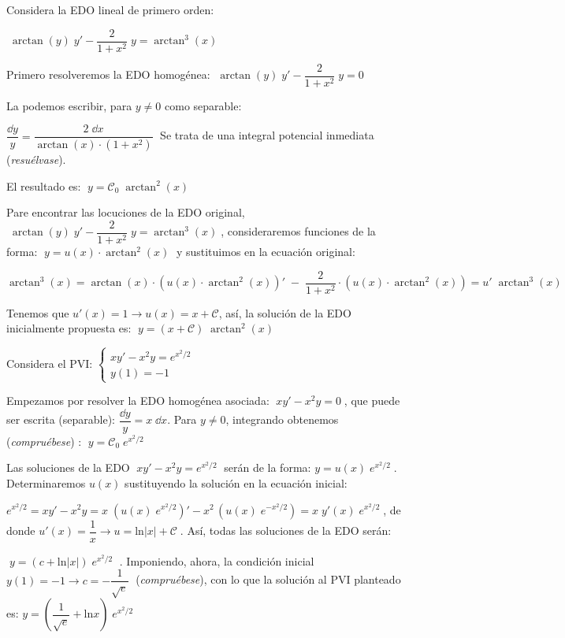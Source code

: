 \begin{ejem}
Considera la EDO lineal de primero orden: 

$\; \arctan(y)\; y'- \dfrac {2}{1+x^2}\; y=\arctan^3 (x)\; $	

Primero resolveremos la EDO homogénea: $\; \arctan(y)\; y'- \dfrac {2}{1+x^2} \; y=0\; $

La podemos escribir, para $y\neq 0$ como separable:

$\dfrac {\dd y}{y }= \dfrac {2\; \dd x} {\arctan (x) \cdot (1+x^2)}  \; $ Se trata de una integral potencial inmediata (\emph{resuélvase}). 

El resultado es: $\; y=\mathcal {C}_0 \; \arctan^2 (x)$ 

Pare encontrar las locuciones de la EDO original, $\; \arctan(y)\; y'- \dfrac {2}{1+x^2}\; y=\arctan^3 (x)\; $, consideraremos funciones de la forma: $\; y=u(x) \cdot  \arctan^2 (x)\; $ y sustituimos en la ecuación original:

$\arctan^3 (x)= \arctan (x) \cdot \left( u(x)\cdot \arctan^2 (x) \right)' \; - \; \dfrac {2}{1+x^2} \cdot \left( u(x) \cdot  \arctan^2 (x) \right) = u'\; \arctan^3 (x)$

Tenemos que $u'(x)=1 \to u(x)=x+\mathcal C$, así, la solución de la EDO inicialmente propuesta es: 
$\; y=(x+	\mathcal C)\; \arctan^2 (x)$

\end{ejem}

\begin{ejem}

Considera el PVI: $\begin{cases} xy'-x^2y=e^{x^2/2} \\ y(1)=-1 \end{cases}$

Empezamos por resolver la EDO homogénea asociada: $\; xy'-x^2y=0\; $, que puede ser escrita (separable): $\dfrac {\dd y}{y}=x\; \dd x$. Para $y\neq 0$, integrando obtenemos (\emph{compruébese}) : $\; y=\mathcal{C}_0\; e^{x^2/2} \; $ 

Las soluciones de la EDO $\; xy'-x^2y=e^{x^2/2} \; $ serán de la forma: $y=u(x)\; e^{x^2/2}\; $. Determinaremos $u(x)$ sustituyendo la solución en la ecuación inicial:

$e^{x^2/2}=xy'-x^2y=x\; \left( u(x)\; e^{x^2/2} \right)' - x^2\, \left( u(x)\; e^{-x^2/2} \right) =x\; y'(x)\; e^{x^2/2}\; $, de donde $u'(x)= \dfrac {1} {x} \to u=\mathrm{ln}|x|+\mathcal C\; $. Así, todas las soluciones de la EDO serán: 

$\; y=\left(c+\mathrm{ln}|x| \right)\; e^{x^2/2}\;$ . Imponiendo, ahora, la condición inicial $y(1)=-1 \to c=-\dfrac {1}{\sqrt{e}}\;$ (\emph{compruébese}), con lo que la solución al PVI planteado es: 
$y=\left( \dfrac {1}{\sqrt{e}} + \mathrm{ln} x  \right) \; e^{x^2/2}$

\end{ejem}

